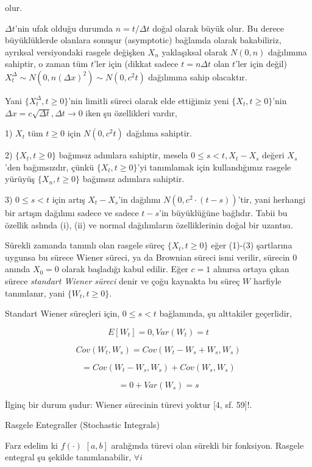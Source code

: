 \documentclass[12pt,fleqn]{article}\usepackage{../../common}
\begin{document}
olur. 

$\Delta t$'nin ufak olduğu durumda $n = t/\Delta t$ doğal olarak büyük olur. Bu
derece büyüklüklerde olanlara sonuşur (asymptotic) bağlamda olarak bakabiliriz,
ayrıksal versiyondaki rasgele değişken $X_n$ yaklaşıksal olarak $N(0,n)$
dağılımına sahiptir, o zaman tüm $t$'ler için (dikkat sadece $t = n \Delta t$
olan $t$'ler için değil) $X_t^{\Delta} \sim N(0, n(\Delta x)^2) \sim N(0, c^2t)$
dağılımına sahip olacaktır.

Yani $\{ X_t^{\Delta}, t \ge 0 \}$'nin limitli süreci olarak elde ettiğimiz yeni
$\{ X_t, t \ge 0 \}$'nin $\Delta x = c \sqrt{\Delta t}, \Delta t \to 0$ iken şu
özellikleri vardır,

1) $X_t$ tüm $t \ge 0$ için $N(0,c^2t)$ dağılıma sahiptir. 

2) $\{ X_t, t \ge 0 \}$ bağımsız adımlara sahiptir, mesela $0 \le s < t,
X_t-X_s$ değeri $X_s$'den bağımsızdır, çünkü $\{ X_t, t \ge 0 \}$'yi tanımlamak
için kullandığımız rasgele yürüyüş $\{ X_n, t \ge 0 \}$ bağımsız adımlara
sahiptir.

3) $0 \le s < t$ için artış $X_t-X_s$'in dağılımı $N(0, c^2 \cdot (t-s))$'tir,
yani herhangi bir artışın dağılımı sadece ve sadece $t-s$'in büyüklüğüne
bağlıdır. Tabii bu özellik aslında (i), (ii) ve normal dağılımların
özelliklerinin doğal bir uzantısı.

Sürekli zamanda tanımlı olan rasgele süreç $\{ X_t, t \ge 0 \}$ eğer (1)-(3)
şartlarına uygunsa bu sürece Wiener süreci, ya da Brownian süreci ismi verilir,
sürecin 0 anında $X_0=0$ olarak başladığı kabul edilir. Eğer $c=1$ alınırsa
ortaya çıkan sürece {\em standart Wiener süreci} denir ve çoğu kaynakta bu süreç
$W$ harfiyle tanımlanır, yani $\{ W_t, t \ge 0 \}$.

Standart Wiener süreçleri için, $0 \le s < t$ bağlamında, şu alttakiler
geçerlidir,

$$ E[W_t] = 0, Var(W_t) = t $$

$$ Cov(W_t,W_s) = Cov(W_t-W_s+W_s, W_s) $$

$$ = Cov(W_t-W_s,W_s) + Cov(W_s,W_s) $$

$$ = 0 + Var(W_s) = s $$

İlginç bir durum şudur: Wiener sürecinin türevi yoktur [4, sf. 59]!.

Rasgele Entegraller (Stochastic Integrals)

Farz edelim ki $f(\cdot)$ $[a,b]$ aralığında türevi olan sürekli bir
fonksiyon. Rasgele entegral şu şekilde tanımlanabilir, $\forall i$
\end{document}
